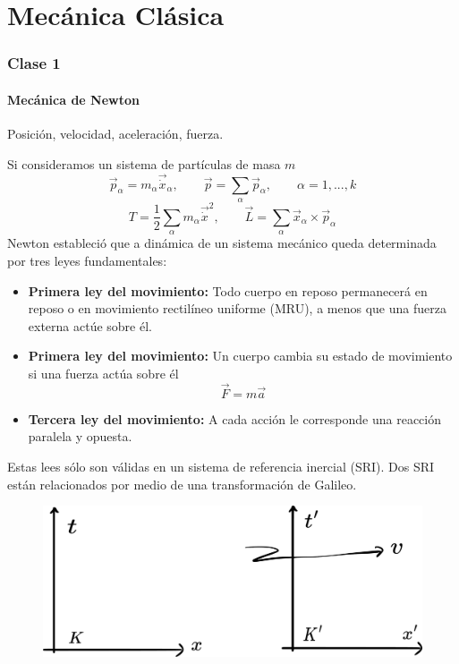 \part{Mecánica Clásica}
\section{Clase 1}
\subsection{Mecánica de Newton}
Posición, velocidad, aceleración, fuerza.

Si consideramos un sistema de partículas de masa $m$
\begin{equation}
  \vec{p}_\alpha =m_\alpha \vec{\dot{x}}_\alpha,\qquad \vec{p}=\sum_\alpha \vec{p}_\alpha,\qquad \alpha=1,...,k
\end{equation}
\begin{equation}
  T=\frac{1}{2}\sum_\alpha m_\alpha \vec{\dot{x}}^2,\qquad \vec{L}=\sum_\alpha \vec{x}_\alpha\times \vec{p}_\alpha
\end{equation}
Newton estableció que a dinámica de un sistema mecánico queda	determinada por tres leyes fundamentales:
\begin{itemize}
	\item \textbf{Primera ley del movimiento:} Todo cuerpo en reposo permanecerá en reposo o en movimiento rectilíneo uniforme (MRU), a menos que una fuerza externa actúe sobre él.
	\item \textbf{Primera ley del movimiento:} Un cuerpo cambia su estado de movimiento si una fuerza actúa sobre él
	\begin{equation}
  \vec{F}=m\vec{a}
\end{equation}

\item \textbf{Tercera ley del movimiento:} A cada acción le corresponde una reacción paralela y opuesta.
\end{itemize}

Estas lees sólo son válidas en un sistema de referencia inercial (SRI). Dos SRI están relacionados por medio de una transformación de Galileo.

\begin{figure}[h!]
	\centering
	\includegraphics[scale=0.2]{fig/Galileo.pdf}
\end{figure}

